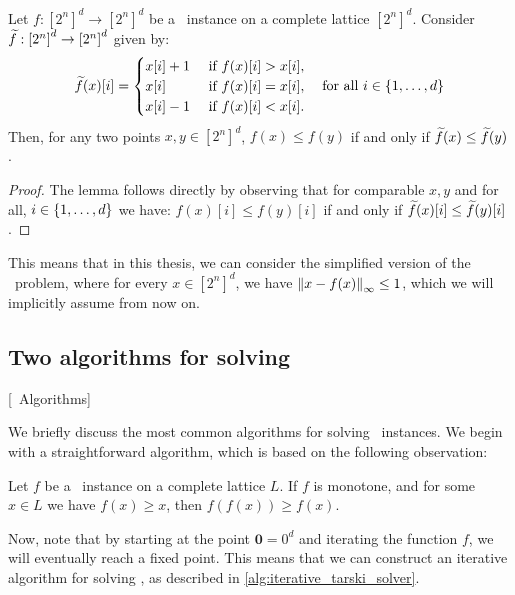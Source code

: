 \begin{lemma}
	Let $f : {[2^n]}^d \rightarrow {[2^n]}^d$ be a \Tarski\ instance on a complete lattice ${[2^n]}^d$. Consider $\widetilde{f} : {[2^n]}^d \rightarrow {[2^n]}^d$ given by: 
	\begin{align*}
		\widetilde{f}(x)[i] = \begin{cases}
			                x[i] + 1 & \text{ if } f(x)[i] > x[i], \\
			                x[i]     & \text{ if } f(x)[i] = x[i], \\
			                x[i] - 1 & \text{ if } f(x)[i] < x[i].
		                \end{cases} \quad \text{for all $i \in \left\{1, \dots, d\right\}$}
	\end{align*}
	Then, for any two points $x, y \in {[2^n]}^d$, $f(x) \leq f(y)$ if and only if $\widetilde{f}(x) \leq \widetilde{f}(y)$.
\end{lemma}
\begin{proof}
	The lemma follows directly by observing that for comparable $x, y$ and for all, $i \in \left\{1, \dots, d\right\}$ we have: $f(x)[i] \leq f(y)[i]$ if and only if $\widetilde{f}(x)[i] \leq \widetilde{f}(y)[i]$.
\end{proof}
This means that in this thesis, we can consider the simplified version of the \Tarski\ problem, where for every $x \in {[2^n]}^d$, we have $\left\lVert x - f(x)\right\rVert_{\infty} \leq 1$, which we will implicitly assume from now on.

\subsection{Two algorithms for solving \Tarski}[\Tarski\ Algorithms]\label{sec:tarski_algorithms}

We briefly discuss the most common algorithms for solving \Tarski\ instances. We begin with a straightforward algorithm, which is based on the following observation:
\begin{remark}
	Let $f$ be a \Tarski\ instance on a complete lattice $L$. If $f$ is monotone, and for some $x \in L$ we have $f(x) \geq x$, then $f(f(x)) \geq f(x)$.
\end{remark}
Now, note that by starting at the point $\mathbf{0} = 0^d$ and iterating the function $f$, we will eventually reach a fixed point. This means that we can construct an iterative algorithm for solving \Tarski, as described in \cref{alg:iterative_tarski_solver}.

